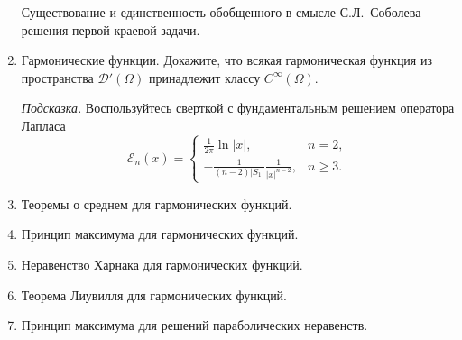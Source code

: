 \documentclass[unicode,12pt,draft]{article}
\begin{document}
\begin{enumerate}
Существование и единственность обобщенного в смысле С.Л.~Соболева
решения первой краевой задачи.

\item
Гармонические функции. Докажите, что всякая гармоническая функция
из пространства ${\mathcal D}' (\Omega)$ принадлежит классу
$C^\infty (\Omega)$.

{\it Подсказка.} Воспользуйтесь сверткой с фундаментальным
решением оператора Лапласа
$$
    {\mathcal E}_n (x)
    =
    \left\{
        \begin{array}{ll}
            \frac{1}{2 \pi}
            \ln |x|,
            &
            n = 2,
            \\
            - \frac{
                1
            }{
                (n - 2)
                |S_1|
            }
            \frac{
                1
            }{
                |x|^{n - 2}
            },
            &
            n \ge 3.
        \end{array}
    \right.
$$

\item
Теоремы о среднем для гармонических функций.

\item
Принцип максимума для гармонических функций.

\item
Неравенство Харнака для гармонических функций.

\item
Теорема Лиувилля для гармонических функций.

\item
Принцип максимума для решений параболических неравенств.

\end{enumerate}
\end{document}
